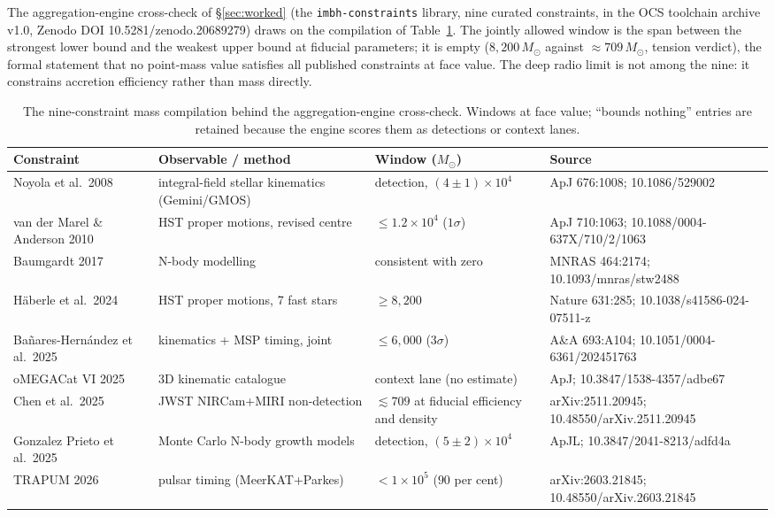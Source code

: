 \documentclass[11pt]{article}
\newcommand{\msun}{\ensuremath{M_\odot}}
\begin{document}
The aggregation-engine cross-check of \S\ref{sec:worked} (the \texttt{imbh-constraints} library, nine curated constraints, in the OCS toolchain archive v1.0, Zenodo DOI 10.5281/zenodo.20689279) draws on the compilation of Table~\ref{tab:nine}. The jointly allowed window is the span between the strongest lower bound and the weakest upper bound at fiducial parameters; it is empty ($8{,}200\,\msun$ against $\approx 709\,\msun$, tension verdict), the formal statement that no point-mass value satisfies all published constraints at face value. The deep radio limit \citep{Mahida2026} is not among the nine: it constrains accretion efficiency rather than mass directly.

\begin{table}[htbp]
\centering
\small
\caption{The nine-constraint mass compilation behind the aggregation-engine cross-check. Windows at face value; ``bounds nothing'' entries are retained because the engine scores them as detections or context lanes.}
\label{tab:nine}
\begin{tabular}{p{2.55cm}p{3.15cm}p{2.5cm}p{4.1cm}}
\toprule
Constraint & Observable / method & Window ($\msun$) & Source \\
\midrule
Noyola et al.\ 2008 & integral-field stellar kinematics (Gemini/GMOS) & detection, $(4\pm1)\times10^{4}$ & ApJ 676:1008; 10.1086/529002 \\
van der Marel \& Anderson 2010 & HST proper motions, revised centre & $\leq 1.2\times10^{4}$ ($1\sigma$) & ApJ 710:1063; 10.1088/0004-637X/710/2/1063 \\
Baumgardt 2017 & N-body modelling & consistent with zero & MNRAS 464:2174; 10.1093/mnras/stw2488 \\
H\"aberle et al.\ 2024 & HST proper motions, 7 fast stars & $\geq 8{,}200$ & Nature 631:285; 10.1038/s41586-024-07511-z \\
Ba\~nares-Hern\'andez et al.\ 2025 & kinematics + MSP timing, joint & $\leq 6{,}000$ ($3\sigma$) & A\&A 693:A104; 10.1051/0004-6361/202451763 \\
oMEGACat VI 2025 & 3D kinematic catalogue & context lane (no estimate) & ApJ; 10.3847/1538-4357/adbe67 \\
Chen et al.\ 2025 & JWST NIRCam+MIRI non-detection & $\lesssim 709$ at fiducial efficiency and density & arXiv:2511.20945; 10.48550/arXiv.2511.20945 \\
Gonzalez Prieto et al.\ 2025 & Monte Carlo N-body growth models & detection, $(5\pm2)\times10^{4}$ & ApJL; 10.3847/2041-8213/adfd4a \\
TRAPUM 2026 & pulsar timing (MeerKAT+Parkes) & $< 1\times10^{5}$ ($90$ per cent) & arXiv:2603.21845; 10.48550/arXiv.2603.21845 \\
\bottomrule
\end{tabular}
\end{table}
\end{document}

